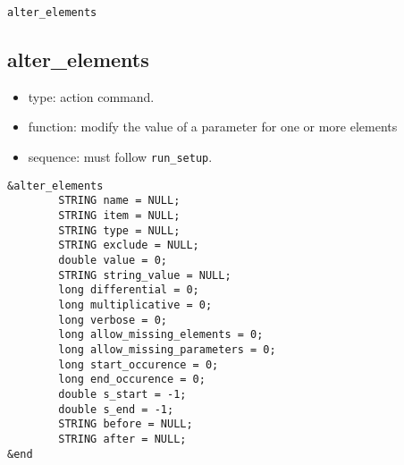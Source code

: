 \documentclass[11pt]{article}
\begin{document}
\clearpage

\newpage
\begin{center}{\Large\verb|alter_elements|}\end{center}
\subsection{alter\_elements\label{subsec:alterelements}}

\begin{itemize}
\item type: action command.
\item function: modify the value of a parameter for one or more elements
\item sequence: must follow \verb|run_setup|.
\end{itemize}

\begin{verbatim}
&alter_elements
        STRING name = NULL;
        STRING item = NULL;
        STRING type = NULL;
        STRING exclude = NULL;
        double value = 0;
        STRING string_value = NULL;
        long differential = 0;
        long multiplicative = 0;
        long verbose = 0;
        long allow_missing_elements = 0;
        long allow_missing_parameters = 0;
        long start_occurence = 0;
        long end_occurence = 0;
        double s_start = -1;
        double s_end = -1;
        STRING before = NULL;
        STRING after = NULL;
&end
\end{verbatim}
\end{document}
